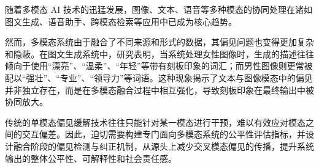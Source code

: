 
随着多模态 AI 技术的迅猛发展，图像、文本、语音等多种模态的协同处理在诸如图文生成、语音助手、跨模态检索等应用中已成为核心趋势。

然而，多模态系统由于融合了不同来源和形式的数据，其偏见问题也变得更加复杂和隐蔽。在图文生成系统中，研究表明，当系统处理女性图像时，生成的描述往往倾向于使用“漂亮”、“温柔”、“年轻”等带有刻板印象的词汇；而男性图像则更常被配以“强壮”、“专业”、“领导力”等词语。这种现象揭示了文本与图像模态中的偏见并非独立存在，而是在多模态融合过程中相互强化，导致刻板印象在最终输出中被协同放大。

传统的单模态偏见缓解技术往往只能针对某一模态进行干预，难以有效应对模态之间的交互偏差。因此，迫切需要构建专门面向多模态系统的公平性评估指标，并设计融合阶段的偏见检测与纠正机制，从源头上减少交叉模态偏见的传播，提升系统输出的整体公平性、可解释性和社会责任感。